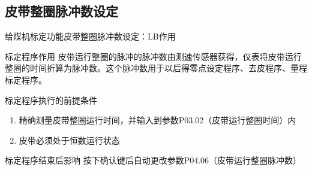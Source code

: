 \documentclass[12pt,hyperref={CJKbookmarks=true}]{beamer} %
\begin{document}
\subsection{皮带整圈脉冲数设定}
\begin{frame}{给煤机标定功能}{皮带整圈脉冲数设定：LB作用}
  		\begin{block}{标定程序作用}
  		皮带运行整圈的脉冲的脉冲数由测速传感器获得，仪表将皮带运行整圈的时间折算为脉冲数。这个脉冲数用于以后得零点设定程序、去皮程序、量程标定程序。
\end{block}
\begin{exampleblock}{标定程序执行的前提条件}
  		\begin{enumerate}
				\item 精确测量皮带整圈运行时间，并输入到参数P03.02（皮带运行整圈时间）内
				\item  皮带必须处于恒数运行状态
			\end{enumerate}
\end{exampleblock}
\begin{alertblock}{标定程序结束后影响}
  		按下确认键后自动更改参数P04.06（皮带运行整圈脉冲数）
\end{alertblock}
	\end{frame}
\end{document}
